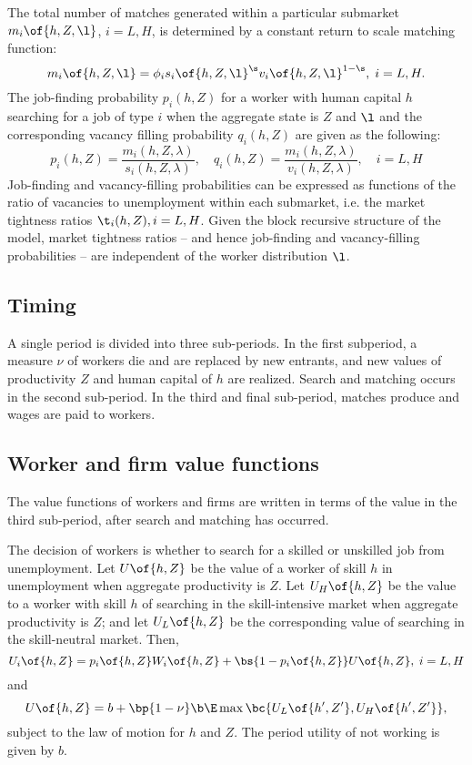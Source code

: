 \documentclass[12pt]{article}
\theoremstyle{definition}
\begin{document}
The total number of matches generated within a particular submarket $m_i\of{h, Z, \l}$, $i = L, H$, is determined by a constant return to scale matching function:
\begin{equation}
    \label{8}
    m_i\of{h, Z, \l} = \phi_i s_i\of{h, Z, \l}^{\s} v_i\of{h, Z, \l}^{1 - \s}, \; i = L, H.
\end{equation}
The job-finding probability $p_i(h, Z)$ for a worker with human capital $h$ searching for a job of type $i$ when the aggregate state is $Z$ and $\l$ and the corresponding vacancy filling probability $q_i(h, Z)$ are given as the following:
\begin{equation}
    \label{9}
    p_i(h, Z)=\frac{m_i(h, Z, \lambda)}{s_i(h, Z, \lambda)}, \quad q_i(h, Z)=\frac{m_i(h, Z, \lambda)}{v_i(h, Z, \lambda)}, \quad i=L, H
\end{equation}
Job-finding and vacancy-filling probabilities can be expressed as functions of the ratio  of vacancies to unemployment within each submarket, i.e. the market tightness ratios $\t_i(h, Z), i = L, H$. Given the block recursive structure of the model, market tightness ratios -- and hence job-finding and vacancy-filling probabilities -- are independent of the worker distribution $\l$.

\subsection{Timing}

A single period is divided into three sub-periods. In the first subperiod, a measure $\nu$ of workers die and are replaced by new entrants, and new values of productivity $Z$ and human capital of $h$ are realized. Search and matching occurs in the second sub-period. In the third and final sub-period, matches produce and wages are paid to workers.

\subsection{Worker and firm value functions}

The value functions of workers and firms are written in terms of the value in the third sub-period, after search and matching has occurred.

The decision of workers is whether to search for a skilled or unskilled job from unemployment. Let $U\of{h, Z}$ be the value of a worker of skill $h$ in unemployment when aggregate productivity is $Z$. Let $U_H\of{h, Z}$ be the value to a worker with skill $h$ of searching in the skill-intensive market when aggregate productivity is $Z$; and let $U_L\of{h, Z}$ be the corresponding value of searching in the skill-neutral market. Then, 
\begin{equation}
    \label{10}
    U_i\of{h, Z} = p_i\of{h, Z} W_i\of{h, Z} + \bs{1 - p_i\of{h, Z}} U\of{h, Z}, \; i = L, H 
\end{equation}
and 
\begin{equation}
    \label{11}
    U\of{h, Z} = b + \bp{1 - \nu} \b \E \max \bc{U_L\of{h^{\prime}, Z^{\prime}}, U_H\of{h^{\prime}, Z^{\prime}}},
\end{equation}
subject to the law of motion for $h$ and $Z$. The period utility of not working is given by $b$. 
\end{document}
